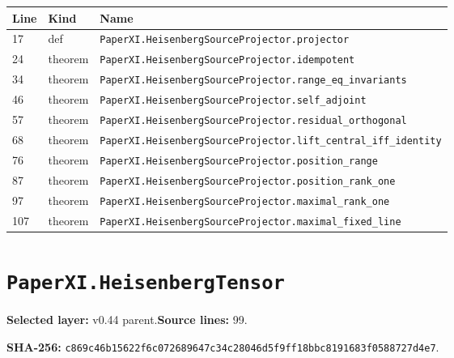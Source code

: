 \documentclass[10pt,oneside]{book}
\begin{document}
\begin{longtable}{@{}p{}p{}p{}@{}}\toprule Line&Kind&Name\\\midrule\endhead

17&def&\nolinkurl{PaperXI.HeisenbergSourceProjector.projector}\\

24&theorem&\nolinkurl{PaperXI.HeisenbergSourceProjector.idempotent}\\

34&theorem&\nolinkurl{PaperXI.HeisenbergSourceProjector.range_eq_invariants}\\

46&theorem&\nolinkurl{PaperXI.HeisenbergSourceProjector.self_adjoint}\\

57&theorem&\nolinkurl{PaperXI.HeisenbergSourceProjector.residual_orthogonal}\\

68&theorem&\nolinkurl{PaperXI.HeisenbergSourceProjector.lift_central_iff_identity}\\

76&theorem&\nolinkurl{PaperXI.HeisenbergSourceProjector.position_range}\\

87&theorem&\nolinkurl{PaperXI.HeisenbergSourceProjector.position_rank_one}\\

97&theorem&\nolinkurl{PaperXI.HeisenbergSourceProjector.maximal_rank_one}\\

107&theorem&\nolinkurl{PaperXI.HeisenbergSourceProjector.maximal_fixed_line}\\

\bottomrule\end{longtable}

\section{\texorpdfstring{\nolinkurl{PaperXI.HeisenbergTensor}}{PaperXI.HeisenbergTensor}}\label{module:PaperXI.HeisenbergTensor}

\textbf{Selected layer:} v0.44 parent.\quad\textbf{Source lines:} 99.\par\textbf{SHA-256:} {\scriptsize\nolinkurl{c869c46b15622f6c072689647c34c28046d5f9ff18bbc8191683f0588727d4e7}}.

\end{document}
